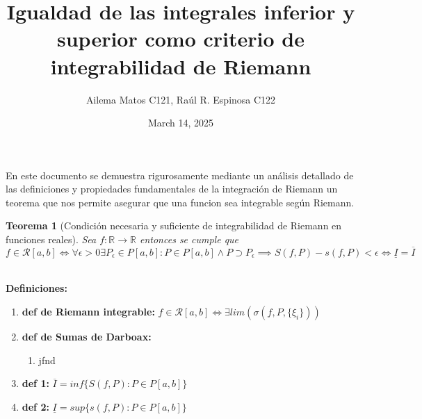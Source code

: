 \documentclass{article}
\title{Igualdad de las integrales inferior y superior como criterio de integrabilidad de Riemann}
\author{
Ailema Matos C121,
Raúl R. Espinosa C122 
}
\date{March 14, 2025}
\newtheorem{theorem}{Teorema}
\begin{document}
\maketitle

\section*{}

En este documento se demuestra rigurosamente mediante un análisis detallado de las definiciones y propiedades fundamentales de la integración de Riemann 
un teorema que nos permite asegurar que una funcion sea integrable según Riemann.\\

\begin{theorem}[Condición necesaria y suficiente de integrabilidad de Riemann en funciones reales]
Sea \( f: \mathbb{R} \to \mathbb{R} \) entonces se cumple que \[f \in \mathcal{R}[a, b] \Longleftrightarrow \forall \epsilon>0  \exists P_\epsilon \in P[a, b]: P \in P[a, b] \wedge P \supset P_\epsilon \implies S(f, P) - s(f, P) < \epsilon \Longleftrightarrow \underline{I} = \overline{I}\]\\
\end{theorem}

\textbf{Definiciones:}

\begin{enumerate}
   \item \textbf{def de Riemann integrable:} \(f \in \mathcal{R}[a, b] \Longleftrightarrow   \exists lim(\sigma(f, P,\{\xi_i\}))\)
    \item \textbf{def de Sumas de Darboax:} 
\begin{enumerate}
	\item jfnd
\end{enumerate}
    \item \textbf{def 1:}  \(\overline{I} = inf \{ S(f, P): P \in P[a, b] \} \)  
    \item \textbf{def 2:}  \(\underline{I} = sup\{ s(f, P): P \in P[a, b] \} \)
\end{enumerate} 
\end{document}

